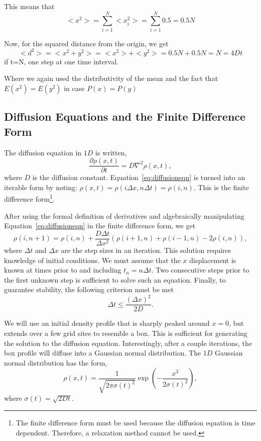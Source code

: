 \documentclass[12pt]{article}
\begin{document}
This means that 
\begin{equation}
    <x^2>=\sum_{i=1}^N <x_i^2>=\sum_{i=1}^N 0.5=0.5N
\end{equation}

Now, for the squared distance from the origin, we get
\begin{equation}
    <d^2>=<x^2+y^2>=<x^2>+<y^2>=0.5N+0.5N=N=4Dt
\end{equation}
if t=N, one step at one time interval.

Where we again used the distributivity of the mean and the fact that $E(x^2)=E(y^2)$ in case $P(x)=P(y)$


\subsection{Diffusion Equations and the Finite Difference Form}
\label{sec:diffusionequation}
The diffusion equation in $1D$ is written,
\begin{equation}
  \label{eq:diffusioneqn}
  \frac{\partial\rho(x,t)}{\partial t} = D\nabla^2\rho(x,t),
\end{equation}
where $D$ is the diffusion constant. Equation~\ref{eq:diffusioneqn} is turned into an iterable form by noting: $\rho(x,t) = \rho(i\Delta x, n\Delta t) = \rho(i,n)$. This is the finite difference form\footnote{The finite difference form must be used because the diffusion equation is time dependent. Therefore, a relaxation method cannot be used.}.

After using the formal definition of derivatives and algebraically manipulating Equation~\ref{eq:diffusioneqn} in the finite difference form, we get
\begin{equation}
  \label{eq:diffusioneqn-iterable}
  \rho(i,n+1) = \rho(i,n) + \frac{D\Delta t}{\Delta x^2}\left(\rho(i+1,n) + \rho(i-1,n) - 2\rho(i,n)\right),
\end{equation}
where $\Delta t$ and $\Delta x$ are the step sizes in an iteration. This solution requires knowledge of initial conditions. We must assume that the $x$ displacement is known at times prior to and including $t_n = n\Delta t$. Two consecutive steps prior to the first unknown step is sufficient to solve such an equation. Finally, to guarantee stability, the following criterion must be met
\begin{equation}
  \label{eq:stabilitycriterion}
  \Delta t \leq \frac{(\Delta x)^2}{2D}.
\end{equation}

We will use an initial density profile that is sharply peaked around $x=0$, but extends over a few grid sites to resemble a box. This is sufficient for generating the solution to the diffusion equation. Interestingly, after a couple iterations, the box profile will diffuse into a Gaussian normal distribution. The $1D$ Gaussian normal distribution has the form,
\begin{equation}
  \label{eq:gaussiandistribution}
  \rho(x,t) = \frac{1}{\sqrt{2\pi\sigma(t)^2}}\exp\left(-\frac{x^2}{2\sigma(t)^2}\right),
\end{equation}
where $\sigma(t) = \sqrt{2Dt}$.
\end{document}
